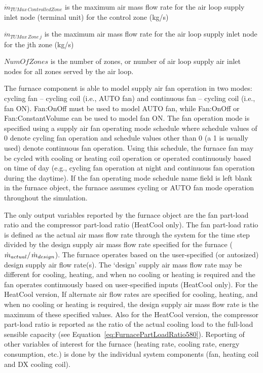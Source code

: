 \({\dot m_{TUMax\,ControlledZone}}\) is the maximum air mass flow rate for the air loop supply inlet node (terminal unit) for the control zone (kg/s)

\({\dot m_{TUMax\,Zone\,j}}\) is the maximum air mass flow rate for the air loop supply inlet node for the jth zone (kg/s)

\(NumOfZones\) is the number of zones, or number of air loop supply air inlet nodes for all zones served by the air loop.

The furnace component is able to model supply air fan operation in two modes: cycling fan -- cycling coil (i.e., AUTO fan) and continuous fan -- cycling coil (i.e., fan ON). Fan:OnOff must be used to model AUTO fan, while Fan:OnOff or Fan:ConstantVolume can be used to model fan ON. The fan operation mode is specified using a supply air fan operating mode schedule where schedule values of 0 denote cycling fan operation and schedule values other than 0 (a 1 is usually used) denote continuous fan operation. Using this schedule, the furnace fan may be cycled with cooling or heating coil operation or operated continuously based on time of day (e.g., cycling fan operation at night and continuous fan operation during the daytime). If the fan operating mode schedule name field is left blank in the furnace object, the furnace assumes cycling or AUTO fan mode operation throughout the simulation.

The only output variables reported by the furnace object are the fan part-load ratio and the compressor part-load ratio (HeatCool only). The fan part-load ratio is defined as the actual air mass flow rate through the system for the time step divided by the design supply air mass flow rate specified for the furnace (\({{{{\dot m}_{actual}}} \mathord{\left/ {\vphantom {{{{\dot m}_{actual}}} {{{\dot m}_{design}}}}} \right. } {{{\dot m}_{design}}}}\)). The furnace operates based on the user-specified (or autosized) design supply air flow rate(s). The `design' supply air mass flow rate may be different for cooling, heating, and when no cooling or heating is required and the fan operates continuously based on user-specified inputs (HeatCool only). For the HeatCool version, If alternate air flow rates are specified for cooling, heating, and when no cooling or heating is required, the design supply air mass flow rate is the maximum of these specified values. Also for the HeatCool version, the compressor part-load ratio is reported as the ratio of the actual cooling load to the full-load sensible capacity (see Equation~\ref{eq:FurnacePartLoadRatio580}). Reporting of other variables of interest for the furnace (heating rate, cooling rate, energy consumption, etc.) is done by the individual system components (fan, heating coil and DX cooling coil).

